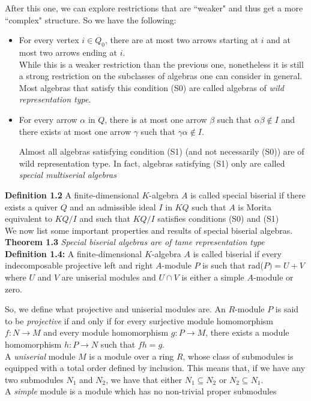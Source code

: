 \documentclass{amsart}
\numberwithin{figure}{section}
\begin{document}
  After this one, we can explore restrictions that are ``weaker" and thus get a more ``complex" structure. So we have the following:
  \begin{itemize}
      \item[(S0)] For every vertex $i\in Q_0$, there are at most two arrows starting at $i$ and at most two arrows ending at $i$.\\
      While this is a weaker restriction than the previous one, nonetheless it is still a strong restriction on the subclasses of algebras one can consider in general. Most algebras that satisfy this condition (S0) are called algebras of \textit{wild representation type}.

      \item[(S1)] For every arrow $\alpha$ in $Q$, there is at most one arrow $\beta$ such that $\alpha\beta\notin I$ and there exists at most one arrow $\gamma$ such that $\gamma\alpha\notin I$.

      Almost all algebras satisfying condition (S1) (and not necessarily (S0)) are of wild representation type. In fact, algebras satisfying (S1) only are called \textit{special multiserial algebras}
      \end{itemize}
\textbf{Definition 1.2 } A finite-dimensional $K$-algebra $A$ is called special biserial if there exists a quiver $Q$ and an admissible ideal $I$ in $KQ$ such that $A$ is Morita equivalent to $KQ/I$ and such that $KQ/I$ satisfies conditions (S0) and (S1)\\


We now list some important properties and results of special biserial algebras.\\


\textbf{Theorem 1.3} \textit{Special biserial algebras are of tame representation type}\\

\textbf{Definition 1.4: } A finite-dimensional $K$-algebra $A$ is called biserial if every indecomposable projective left and right $A$-module $P$ is such that rad($P)=U+V$ where $U$ and $V$ are uniserial modules and $U \cap V$ is either a simple $A$-module or zero.

So, we define what projective and uniserial modules are. An $R$-module $P$ is said to be \textit{projective} if and only if for every surjective module homomorphism $f : N \to M$ and every module homomorphism $g : P \to M$, there exists a module homomorphism $h : P \to N$ such that $fh = g$.\\
A \textit{uniserial} module $M$ is a module over a ring $R$, whose class of submodules is equipped with a total order defined by inclusion. This means that, if we have any two submodules $N_1$ and $N_2$, we have that either $N_1 \subseteq N_2$ or $N_2 \subseteq N_1$. \\
A \textit{simple} module is a module which has no non-trivial proper submodules\\
\end{document}

